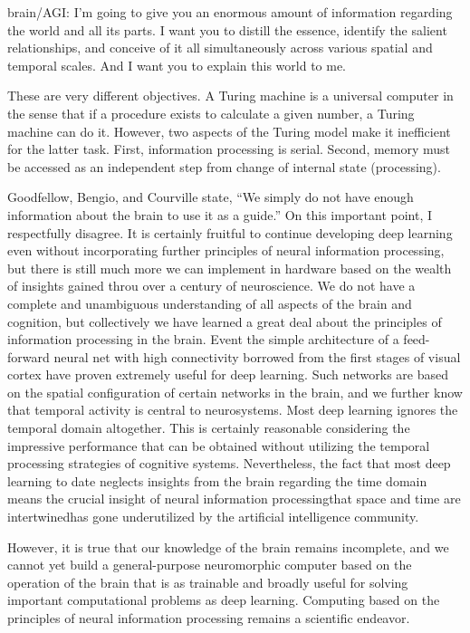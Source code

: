\documentclass[twocolumn]{article}
\begin{document}
brain/AGI: I'm going to give you an enormous amount of information regarding the world and all its parts. I want you to distill the essence, identify the salient relationships, and conceive of it all simultaneously across various spatial and temporal scales. And I want you to explain this world to me.

These are very different objectives. A Turing machine is a universal computer in the sense that if a procedure exists to calculate a given number, a Turing machine can do it. However, two aspects of the Turing model make it inefficient for the latter task. First, information processing is serial. Second, memory must be accessed as an independent step from change of internal state (processing).

\vspace{3em}
Goodfellow, Bengio, and Courville state, ``We simply do not have enough information about the brain to use it as a guide.'' On this important point, I respectfully disagree. It is certainly fruitful to continue developing deep learning even without incorporating further principles  of neural information processing, but there is still much more we can implement in hardware based on the wealth of insights gained throu over a century of neuroscience. We do not have a complete and unambiguous understanding of all aspects of the brain and cognition, but collectively we have learned a great deal about the principles of information processing in the brain. Event the simple architecture of a feed-forward neural net with high connectivity borrowed from the first stages of visual cortex have proven extremely useful for deep learning. Such networks are based on the spatial configuration of certain networks in the brain, and we further know that temporal activity is central to neurosystems. Most deep learning ignores the temporal domain altogether. This is certainly reasonable considering the impressive performance that can be obtained without utilizing the temporal processing strategies of cognitive systems. Nevertheless, the fact that most deep learning to date neglects insights from the brain regarding the time domain means the crucial insight of neural information processing\textemdash that space and time are intertwined\textemdash has gone underutilized by the artificial intelligence community. 

However, it is true that our knowledge of the brain remains incomplete, and we cannot yet build a general-purpose neuromorphic computer based on the operation of the brain that is as trainable and broadly useful for solving important computational problems as deep learning. Computing based on the principles of neural information processing remains a scientific endeavor. 
\end{document}
